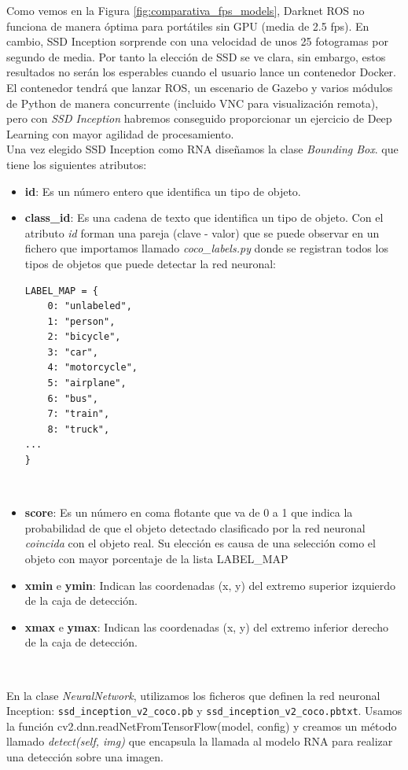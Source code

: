 Como vemos en la Figura \ref{fig:comparativa_fps_models}, Darknet ROS no funciona de manera óptima para portátiles sin GPU (media de 2.5 fps). En cambio, SSD Inception sorprende con una velocidad de unos 25 fotogramas por segundo de media. Por tanto la elección de SSD se ve clara, sin embargo, estos resultados no serán los esperables cuando el usuario lance un contenedor Docker. El contenedor tendrá que lanzar ROS, un escenario de Gazebo y varios módulos de Python de manera concurrente (incluido VNC para visualización remota), pero con \textit{SSD Inception} habremos conseguido proporcionar un ejercicio de Deep Learning con mayor agilidad de procesamiento.\\

Una vez elegido SSD Inception como RNA diseñamos la clase \textit{Bounding Box}. que tiene los siguientes atributos:

\begin{itemize}
	\item \textbf{id}: Es un número entero que identifica un tipo de objeto.
	\item \textbf{class\_id}: Es una cadena de texto que identifica un tipo de objeto. Con el atributo \textit{id} forman una pareja (clave - valor) que se puede observar en un fichero que importamos llamado \textit{coco\_labels.py} donde se registran todos los tipos de objetos que puede detectar la red neuronal:\\
\begin{lstlisting}
LABEL_MAP = {
    0: "unlabeled",
    1: "person",
    2: "bicycle",
    3: "car",
    4: "motorcycle",
    5: "airplane",
    6: "bus",
    7: "train",
    8: "truck",
...
}
\end{lstlisting}\
	\item \textbf{score}: Es un número en coma flotante que va de 0 a 1 que indica la probabilidad de que el objeto detectado clasificado por la red neuronal \textit{coincida} con el objeto real. Su elección es causa de una selección como el objeto con mayor porcentaje de la lista LABEL\_MAP
	\item \textbf{xmin} e \textbf{ymin}: Indican las coordenadas (x, y) del extremo superior izquierdo de la caja de detección.
	\item \textbf{xmax} e \textbf{ymax}: Indican las coordenadas (x, y) del extremo inferior derecho de la caja de detección.
\end{itemize}\

En la clase \textit{NeuralNetwork}, utilizamos los ficheros que definen la red neuronal Inception: \texttt{ssd\_inception\_v2\_coco.pb} y \texttt{ssd\_inception\_v2\_coco.pbtxt}. Usamos la función cv2.dnn.readNetFromTensorFlow(model, config) y creamos un método llamado \textit{detect(self, img)} que encapsula la llamada al modelo RNA para realizar una detección sobre una imagen.\\

